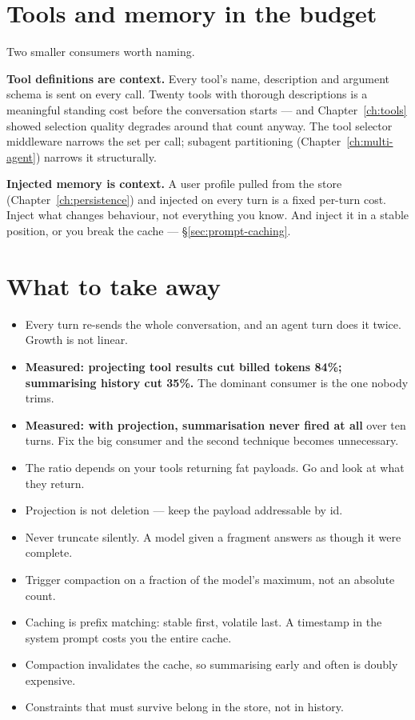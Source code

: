 \section{Tools and memory in the budget}
\label{sec:tools-memory-context}

Two smaller consumers worth naming.

\textbf{Tool definitions are context.} Every tool's name, description and
argument schema is sent on every call. Twenty tools with thorough descriptions
is a meaningful standing cost before the conversation starts --- and
Chapter~\ref{ch:tools} showed selection quality degrades around that count
anyway. The tool selector middleware narrows the set per call; subagent
partitioning (Chapter~\ref{ch:multi-agent}) narrows it structurally.

\textbf{Injected memory is context.} A user profile pulled from the store
(Chapter~\ref{ch:persistence}) and injected on every turn is a fixed per-turn
cost. Inject what changes behaviour, not everything you know. And inject it in a
stable position, or you break the cache --- \S\ref{sec:prompt-caching}.

\section{What to take away}
\label{sec:ch12-summary}

\begin{itemize}[leftmargin=1.4em]
\item Every turn re-sends the whole conversation, and an agent turn does it
      twice. Growth is not linear.
\item \textbf{Measured: projecting tool results cut billed tokens 84\%;
      summarising history cut 35\%.} The dominant consumer is the one nobody
      trims.
\item \textbf{Measured: with projection, summarisation never fired at all} over
      ten turns. Fix the big consumer and the second technique becomes
      unnecessary.
\item The ratio depends on your tools returning fat payloads. Go and look at what
      they return.
\item Projection is not deletion --- keep the payload addressable by id.
\item Never truncate silently. A model given a fragment answers as though it were
      complete.
\item Trigger compaction on a fraction of the model's maximum, not an absolute
      count.
\item Caching is prefix matching: stable first, volatile last. A timestamp in the
      system prompt costs you the entire cache.
\item Compaction invalidates the cache, so summarising early and often is doubly
      expensive.
\item Constraints that must survive belong in the store, not in history.
\end{itemize}


